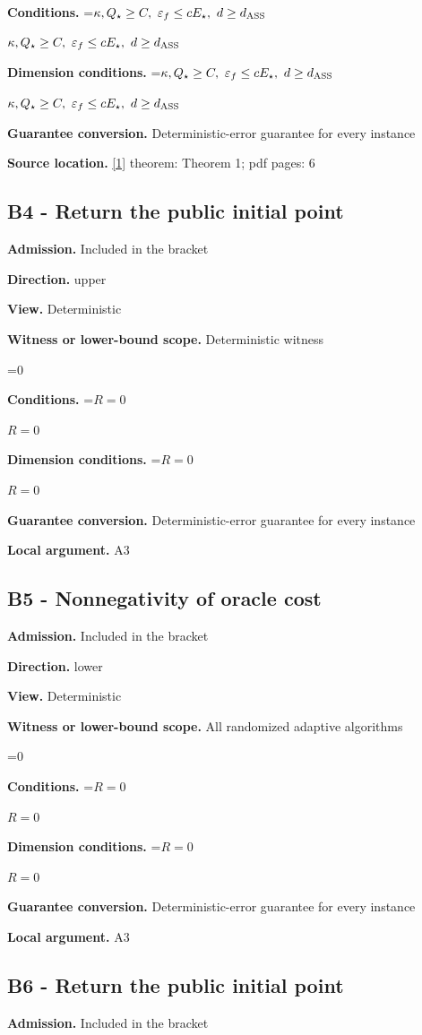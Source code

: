 \documentclass[10pt,a4paper]{article}
\newcommand{\AtlasMath}[1]{\par\begingroup\centering\setbox0=\hbox{$\displaystyle #1$}\ifdim\wd0>1.4\linewidth\typeout{ATLAS WIDE FORMULA: \the\wd0}\fi\ifdim\wd0>\linewidth\resizebox{\linewidth}{!}{\box0}\else\box0\fi\par\endgroup}
\newcommand{\AtlasInlineMath}[1]{\begingroup\setbox0=\hbox{$#1$}\ifdim\wd0>.4\linewidth\endgroup\AtlasMath{#1}\else\endgroup$#1$\fi}
\begin{document}
\textbf{Conditions.} \AtlasInlineMath{\kappa,Q_\star\ge C,\ \varepsilon_f\le cE_\star,\ d\ge d_{\rm ASS}}

\textbf{Dimension conditions.} \AtlasInlineMath{\kappa,Q_\star\ge C,\ \varepsilon_f\le cE_\star,\ d\ge d_{\rm ASS}}

\textbf{Guarantee conversion.} Deterministic-error guarantee for every instance

\textbf{Source location.} \href{https://arxiv.org/pdf/1705.07260v2}{[1]} theorem: Theorem 1; pdf pages: 6

\subsection{B4 - Return the public initial point}
\textbf{Admission.} Included in the bracket

\textbf{Direction.} upper

\textbf{View.} Deterministic

\textbf{Witness or lower-bound scope.} Deterministic witness

\AtlasMath{0}
\textbf{Conditions.} \AtlasInlineMath{R=0}

\textbf{Dimension conditions.} \AtlasInlineMath{R=0}

\textbf{Guarantee conversion.} Deterministic-error guarantee for every instance

\textbf{Local argument.} A3

\subsection{B5 - Nonnegativity of oracle cost}
\textbf{Admission.} Included in the bracket

\textbf{Direction.} lower

\textbf{View.} Deterministic

\textbf{Witness or lower-bound scope.} All randomized adaptive algorithms

\AtlasMath{0}
\textbf{Conditions.} \AtlasInlineMath{R=0}

\textbf{Dimension conditions.} \AtlasInlineMath{R=0}

\textbf{Guarantee conversion.} Deterministic-error guarantee for every instance

\textbf{Local argument.} A3

\subsection{B6 - Return the public initial point}
\textbf{Admission.} Included in the bracket
\end{document}
